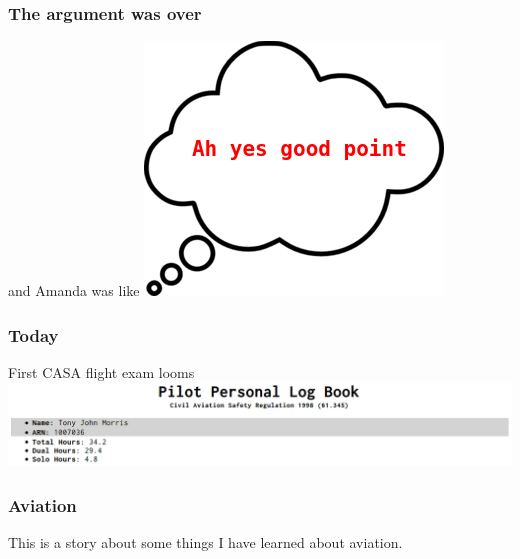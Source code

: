 \begin{frame}
\frametitle{The argument was over}
\begin{block}{and Amanda was like}
\includegraphics[height=0.5\textheight]{image/thought-bubble-good-point.png}
\end{block}
\end{frame}

\begin{frame}
\frametitle{Today}
\begin{block}{First CASA flight exam looms}
\includegraphics[height=0.2\textheight]{image/logbook-hours.png}
\end{block}
\end{frame}

\begin{frame}
\frametitle{Aviation}
\begin{center}
This is a story about some things I have learned about aviation.
\end{center}
\end{frame}
